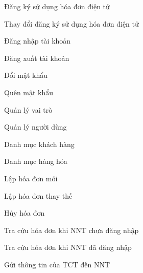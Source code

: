 






Đăng ký sử dụng hóa đơn điện tử



Thay đổi đăng ký sử dụng hóa đơn điện tử



Đăng nhập tài khoản



Đăng xuất tài khoản



Đổi mật khẩu



Quên mật khẩu














Quản lý vai trò



Quản lý người dùng














Danh mục khách hàng



Danh mục hàng hóa














Lập hóa đơn mới



Lập hóa đơn thay thế



Hủy hóa đơn














Tra cứu hóa đơn khi NNT chưa đăng nhập



Tra cứu hóa đơn khi NNT đã đăng nhập














Gửi thông tin của TCT đến NNT